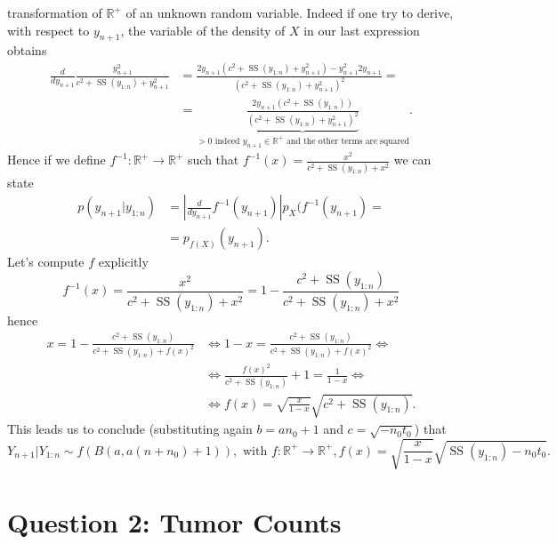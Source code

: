 \documentclass[
  11pt,
]{article}
\begin{document}
transformation of \(\mathbb{R}^+\) of an unknown random variable. Indeed
if one try to derive, with respect to \(y_{n + 1}\), the variable of the
density of \(X\) in our last expression obtains \begin{align*}
    \frac{d}{d y_{n + 1}} \frac{y_{n + 1}^2}{c^2 + \operatorname{SS}\left(y_{1:n}\right) + y_{n + 1}^2} & = \frac{2y_{n + 1}(c^2 + \operatorname{SS}\left(y_{1:n}\right) + y_{n + 1}^2) - y_{n + 1}^2 2 y_{n + 1}}{\left(c^2 + \operatorname{SS}\left(y_{1:n}\right) + y_{n + 1}^2\right)^2} = \\
    & = \underbrace{\frac{2y_{n + 1}(c^2 + \operatorname{SS}\left(y_{1:n}\right))}{\left(c^2 + \operatorname{SS}\left(y_{1:n}\right) + y_{n + 1}^2\right)^2}}_{> 0 \text{ indeed $y_{n + 1} \in \mathbb{R}^+$ and the other terms are squared}}.
\end{align*} Hence if we define
\(f^{-1}: \mathbb{R}^+ \to \mathbb{R}^+\) such that
\(\displaystyle f^{-1}(x) = \frac{x^2}{c^2 + \operatorname{SS}\left(y_{1:n}\right) + x^2}\)
we can state \begin{align*}
    p(y_{n + 1} | y_{1:n}) & = \left|\frac{d}{d y_{n + 1}} f^{-1}(y_{n + 1}) \right| p_X(f^{-1}(y_{n + 1}) = \\
    & = p_{f(X)}(y_{n + 1}).
\end{align*} Let's compute \(f\) explicitly
\[f^{-1}(x) = \frac{x^2}{c^2 + \operatorname{SS}\left(y_{1:n}\right) + x^2} = 1 - \frac{c^2 + \operatorname{SS}\left(y_{1:n}\right)}{c^2 + \operatorname{SS}\left(y_{1:n}\right) + x^2}\]
hence \begin{align*}
    x = 1 - \frac{c^2 + \operatorname{SS}\left(y_{1:n}\right)}{c^2 + \operatorname{SS}\left(y_{1:n}\right) + f(x)^2} & \iff 1 - x = \frac{c^2 + \operatorname{SS}\left(y_{1:n}\right)}{c^2 + \operatorname{SS}\left(y_{1:n}\right) + f(x)^2} \iff \\
    & \iff \frac{f(x)^2}{c^2 + \operatorname{SS}\left(y_{1:n}\right)} + 1 = \frac{1}{1 - x} \iff \\
    & \iff f(x) = \sqrt{\frac{x}{1 - x}} \sqrt{c^2 + \operatorname{SS}\left(y_{1:n}\right)}.
\end{align*} This leads us to conclude (substituting again
\(b = an_0 + 1\) and \(c = \sqrt{-n_0t_0}\)) that
\[Y_{n + 1} | Y_{1:n} \sim f\left(B(a, a(n + n_0) + 1)\right), \text{ with } f: \mathbb{R}^+ \to \mathbb{R}^+, f(x) = \sqrt{\frac{x}{1 - x}} \sqrt{\operatorname{SS}\left(y_{1:n}\right) - n_0t_0}.\]

\hypertarget{question-2-tumor-counts}{%
\section{Question 2: Tumor Counts}\label{question-2-tumor-counts}}
\end{document}
